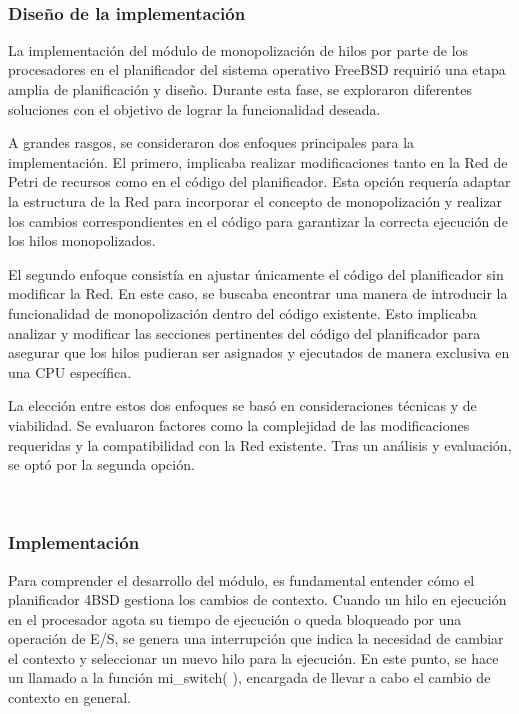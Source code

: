 \

\subsubsection{Diseño de la implementación}

La implementación del módulo de monopolización de hilos por parte de los procesadores en el planificador del sistema operativo FreeBSD requirió una etapa amplia de planificación y diseño. Durante esta fase, se exploraron diferentes soluciones con el objetivo de lograr la funcionalidad deseada.\par

A grandes rasgos, se consideraron dos enfoques principales para la implementación. El primero, implicaba realizar modificaciones tanto en la Red de Petri de recursos como en el código del planificador. Esta opción requería adaptar la estructura de la Red para incorporar el concepto de monopolización y realizar los cambios correspondientes en el código para garantizar la correcta ejecución de los hilos monopolizados.\par

El segundo enfoque consistía en ajustar únicamente el código del planificador sin modificar la Red. En este caso, se buscaba encontrar una manera de introducir la funcionalidad de monopolización dentro del código existente. Esto implicaba analizar y modificar las secciones pertinentes del código del planificador para asegurar que los hilos pudieran ser asignados y ejecutados de manera exclusiva en una CPU específica.\par

La elección entre estos dos enfoques se basó en consideraciones técnicas y de viabilidad. Se evaluaron factores como la complejidad de las modificaciones requeridas y la compatibilidad con la Red existente. Tras un análisis y evaluación, se optó por la segunda opción.\par

\

\subsubsection{Implementación}

Para comprender el desarrollo del módulo, es fundamental entender cómo el planificador 4BSD gestiona los cambios de contexto. Cuando un hilo en ejecución en el procesador agota su tiempo de ejecución o queda bloqueado por una operación de E/S, se genera una interrupción que indica la necesidad de cambiar el contexto y seleccionar un nuevo hilo para la ejecución. En este punto, se hace un llamado a la función mi\_switch( ), encargada de llevar a cabo el cambio de contexto en general.


